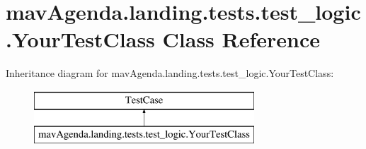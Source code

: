 \hypertarget{classmavAgenda_1_1landing_1_1tests_1_1test__logic_1_1YourTestClass}{}\section{mav\+Agenda.\+landing.\+tests.\+test\+\_\+logic.\+Your\+Test\+Class Class Reference}
\label{classmavAgenda_1_1landing_1_1tests_1_1test__logic_1_1YourTestClass}
Inheritance diagram for mav\+Agenda.\+landing.\+tests.\+test\+\_\+logic.\+Your\+Test\+Class\+:\begin{figure}[H]
\begin{center}
\leavevmode
\includegraphics[height=2.000000cm]{classmavAgenda_1_1landing_1_1tests_1_1test__logic_1_1YourTestClass}
\end{center}
\end{figure}
